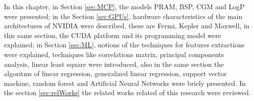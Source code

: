 







In this chapter, in Section \ref{sec:MCP}, the models PRAM, BSP, CGM and LogP were presented; in the Section \ref{sec:GPUs}, hardware characteristics of the main architectures of NVIDIA were described, these are Fermi, Kepler and Maxwell, in this same section, the CUDA platform and its programming model were explained; in Section \ref{sec:ML}, notions of the techniques for features extractions were explained, techniques like correlations matrix, principal components analysis, linear least square were introduced, also in the same section the algoritms of linear regression, generalized linear regression, support vector machine, random forest and Artificial Neural Networks were briely presented. In the section \ref{sec:relWorks} the related works related of this research were reviewed.
